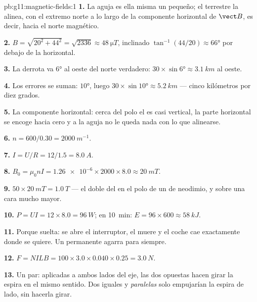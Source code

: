 \begin{solution}{pb:g11:magnetic-fields:1}
\textbf{1.} La aguja es ella misma un  pequeño; el  terrestre
la alinea, con el extremo norte a lo largo de la componente horizontal
de $\vect B$, es decir, hacia el norte magnético.

\textbf{2.} $B = \sqrt{20^2 + 44^2} = \sqrt{2336} \approx
\qty{48}{\micro T}$, inclinado $\tan^{-1}(44/20) \approx \ang{66}$ por
debajo de la horizontal.

\textbf{3.} La derrota va $\ang{6}$ al oeste del norte verdadero:
$30 \times \sin\ang{6} \approx \qty{3.1}{km}$ al oeste.

\textbf{4.} Los errores se suman: $\ang{10}$, luego
$30 \times \sin\ang{10} \approx \qty{5.2}{km}$ --- cinco kilómetros por
diez grados.

\textbf{5.} La componente horizontal: cerca del polo el  es casi
vertical, la parte horizontal se encoge hacia cero y a la aguja no le
queda nada con lo que alinearse.

\textbf{6.} $n = 600/0.30 = \qty{2000}{m^{-1}}$.

\textbf{7.} $I = U/R = 12/1.5 = \qty{8.0}{A}$.

\textbf{8.} $B_0 = \mu_0 n I = \num{1.26e-6} \times 2000 \times 8.0
\approx \qty{20}{mT}$.

\textbf{9.} $50 \times \qty{20}{mT} = \qty{1.0}{T}$ --- el doble del
 en el polo de un  de neodimio, y sobre una cara mucho mayor.

\textbf{10.} $P = UI = 12 \times 8.0 = \qty{96}{W}$; en
\qty{10}{\minute}: $E = 96 \times 600 \approx \qty{58}{kJ}$.

\textbf{11.} Porque suelta: se abre el interruptor, el  muere y el
coche cae exactamente donde se quiere. Un  permanente agarra para
siempre.

\textbf{12.} $F = NILB = 100 \times 3.0 \times 0.040 \times 0.25 =
\qty{3.0}{N}$.

\textbf{13.} Un par: aplicadas a ambos lados del eje, las dos 
opuestas hacen girar la espira en el mismo sentido. Dos  iguales
y \emph{paralelas} solo empujarían la espira de lado, sin hacerla girar.


\end{solution}
